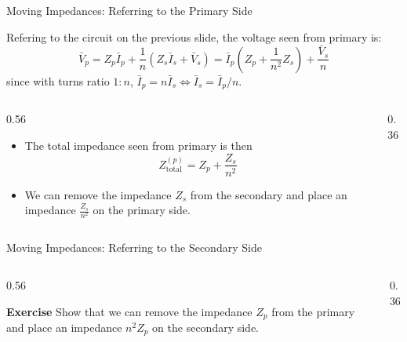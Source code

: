 \begin{frame}{Moving Impedances: Referring to the Primary Side}


Refering to the circuit on the previous slide, the voltage seen from primary is: 
$$\bar{V}_p = Z_p \bar{I}_p + \frac{1}{n} \left( Z_s \bar{I}_s + \bar{V}_s\right)
          = \bar{I}_p \left(Z_p + \frac{1}{n^2} Z_s \right) + \frac{\bar{V}_s}{n}$$
since with turns ratio $1:n$,  $\bar{I}_p = n \bar{I}_s \iff \bar{I}_s = \bar{I}_p/n$.

\begin{columns}
\begin{column}{0.56\textwidth}
\begin{itemize}
    \item The total impedance seen from primary is then 
    $$Z_{\text{total}}^{(p)} = Z_p + \frac{Z_s}{n^2}$$
    \item We can remove the impedance $Z_s$ from the secondary and place an impedance $\frac{Z_s}{n^2}$ on the primary side.
\end{itemize}
\normalsize
\end{column}
\begin{column}{0.36\textwidth}
    \centering
    
\end{column}
\end{columns}
\end{frame}

\begin{frame}{Moving Impedances: Referring to the Secondary Side}

\begin{columns}
\begin{column}{0.56\textwidth}
\begin{block}{\textbf{Exercise}}
Show that we can remove the impedance $Z_p$ from the primary and place an impedance ${n^2}{Z_p}$ on the secondary side.
\end{block}
\end{column}
\begin{column}{0.36\textwidth}
    \centering
    
\end{column}
\end{columns}
\end{frame}

